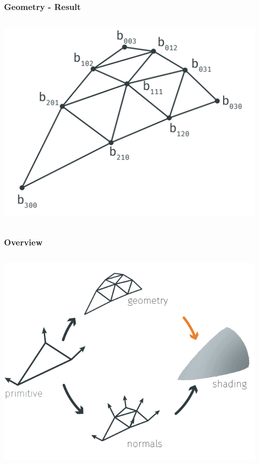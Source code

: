 	\begin{frame}\frametitle{Geometry - Result}
		\begin{columns}
			\begin{column}{0.6\textwidth}
				\begin{center}
				\includegraphics[width=\textwidth]{img/1_single/geometry_4.png}
				\end{center}	
			\end{column}
		\end{columns}
	\end{frame}

	\begin{frame}\frametitle{Overview}
		\begin{columns}
			\begin{column}{0.9\textwidth}
				\begin{center}
					\includegraphics[width=\textwidth]{./img/1_single/recap_geomToShading.png}
				\end{center}		
			\end{column}
		\end{columns}
	\end{frame}	

